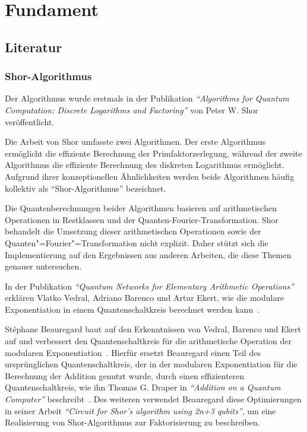 \section{Fundament}
\subsection{Literatur} 
\subsubsection*{Shor-Algorithmus}
Der Algorithmus wurde erstmals in der Publikation \textit{"`Algorithms for Quantum Computation: Discrete Logarithms and Factoring"'} von Peter W. Shor veröffentlicht.

Die Arbeit von Shor umfasste zwei Algorithmen.
Der erste Algorithmus ermöglicht die effiziente Berechnung der Primfaktorzerlegung, 
während der zweite Algorithmus die effiziente Berechnung des diskreten Logarithmus ermöglicht.
Aufgrund ihrer konzeptionellen Ähnlichkeiten werden beide Algorithmen häufig kollektiv als "`Shor-Algorithmus"' bezeichnet.

Die Quantenberechnungen beider Algorithmen basieren auf arithmetischen Operationen in Restklassen und der Quanten-Fourier-Transformation. 
Shor behandelt die Umsetzung dieser arithmetischen Operationen sowie der Quanten"=Fourier"=Transformation nicht explizit. 
Daher stützt sich die Implementierung auf den Ergebnissen aus anderen Arbeiten, die diese Themen genauer untersuchen.

In der Publikation \textit{"`Quantum Networks for Elementary Arithmetic Operations"'} erklären Vlatko Vedral,  Adriano Barenco und Artur Ekert,
wie die modulare Exponentiation in einem Quantenschaltkreis berechnet werden kann~\cite{Vedral_1996}. 

St\'{e}phane Beauregard baut auf den Erkenntnissen von Vedral, Barenco und Ekert auf und
verbessert den Quantenschaltkreis für die arithmetische Operation der modularen Exponentiation~\cite{beauregard2003circuit}.
Hierfür ersetzt Beauregard einen Teil des ursprünglichen Quantenschaltkreis,
der in der modularen Exponentiation für die Berechnung der Addition genutzt wurde, 
durch einen effizienteren Quantenschaltkreis,
wie ihn Thomas G. Draper in \textit{"`Addition on a Quantum Computer"'} beschreibt~\cite{draper2000addition}.
Des weiteren verwendet Beauregard diese Optimierungen in seiner Arbeit \textit{"`Circuit for Shor’s algorithm using 2n+3 qubits"'},
um eine Realisierung von Shor-Algorithmus zur Faktorisierung zu beschreiben.

